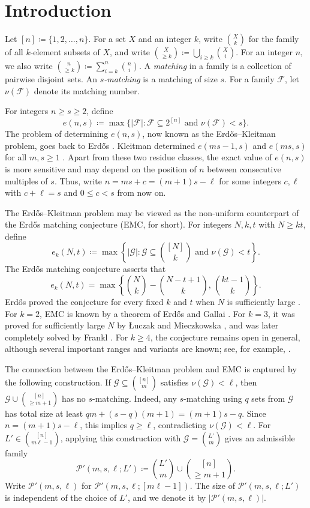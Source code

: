 \documentclass[10pt,a4paper]{article}
\numberwithin{equation}{section}
\theoremstyle{definition}
\newcommand{\F}{\mathcal F}
\newcommand{\G}{\mathcal G}
\begin{document}
\section{Introduction}
Let $ [n]\coloneqq \{1,2,\ldots,n\} $.
For a set $X$ and an integer $k$, write $\binom Xk$ for the family of all $k$-element subsets of $X$, and write $\binom X{\ge k}\coloneqq \bigcup_{i\ge k}\binom Xi$.
For an integer $n$, we also write $\binom n{\ge k}\coloneqq \sum_{i=k}^n \binom ni$.
A \emph{matching} in a family is a collection of pairwise disjoint sets.
An \emph{$s$-matching} is a matching of size $s$.
For a family $\F$, let $\nu(\F)$ denote its matching number.

For integers $n\ge s\ge2$, define
\[
        e(n,s)
        \coloneqq
        \max\{ |\F|:\F\subseteq2^{[n]}\text{ and }\nu(\F)<s\}.
\]
The problem of determining $e(n,s)$, now known as the Erd\H{o}s--Kleitman problem, goes back to Erd\H{o}s \cite{ErdosKleitman1974,ErdosKoRado}.
Kleitman determined $e(ms-1,s)$ and $e(ms,s)$ for all $m,s\ge1$ \cite{Kleitman}.
Apart from these two residue classes, the exact value of $e(n,s)$ is more sensitive and may depend on the position of $n$ between consecutive multiples of $s$.
Thus, write $n=ms+c=(m+1)s-\ell$ for some integers $c,\ell$ with $c+\ell=s$ and $0\le c<s$ from now on.

The Erd\H{o}s--Kleitman problem may be viewed as the non-uniform counterpart of the Erd\H{o}s matching conjecture (EMC, for short).
For integers $N,k,t$ with $N\ge kt$, define
\[
        e_k(N,t)
        \coloneqq
        \max\left\{|\G|:\G\subseteq\binom{[N]}k
        \text{ and } \nu(\G)<t\right\}.
\]
The Erd\H{o}s matching conjecture asserts that
\[
        e_k(N,t)
        =
        \max\left\{
        \binom Nk-\binom{N-t+1}k,\,
        \binom{kt-1}k
        \right\}.
\]
Erd\H{o}s proved the conjecture for every fixed $k$ and $t$ when $N$ is sufficiently large \cite{ErdosEMC}.
For $k=2$, EMC is known by a theorem of Erd\H{o}s and Gallai \cite{ErdosGallai}.
For $k=3$, it was proved for sufficiently large $N$ by \L{}uczak and Mieczkowska \cite{LuczakMieczkowska}, and was later completely solved by Frankl \cite{FranklDAM}.
For $k\ge4$, the conjecture remains open in general, although several important ranges and variants are known; see, for example, \cite{Frankl2017NewRange,FK2022,FranklLuMaWu2026,FranklWangOverlapping,GaoLuMaYu2022,KupavskiiRainbow}.

The connection between the Erd\H{o}s--Kleitman problem and EMC is captured by the following construction.
If $\G\subseteq\binom{[n]}m$ satisfies $\nu(\G)<\ell$, then $\G\cup\binom{[n]}{\ge m+1}$ has no $s$-matching.
Indeed, any $s$-matching using $q$ sets from $\G$ has total size at least $qm+(s-q)(m+1)=(m+1)s-q$.
Since $n=(m+1)s-\ell$, this implies $q\ge\ell$, contradicting $\nu(\G)<\ell$.
For $L'\in\binom{[n]}{m\ell-1}$, applying this construction with $\G=\binom{L'}m$ gives an admissible family
\[
        \mathcal P'(m,s,\ell;L')
        \coloneqq
        \binom{L'}m\cup\binom{[n]}{\ge m+1}.
\]
Write $\mathcal P'(m,s,\ell)$ for $\mathcal P'(m,s,\ell;[m\ell-1])$.
The size of $\mathcal P'(m,s,\ell;L')$ is independent of the choice of $L'$, and we denote it by $|\mathcal P'(m,s,\ell)|$.
\end{document}
